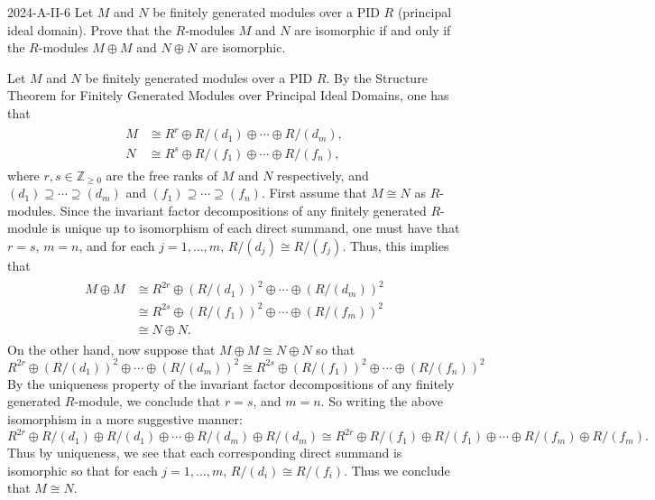 \documentclass{article}
\begin{document}
	\begin{prb}{2024-A-II-6}
		Let $M$ and $N$ be finitely generated modules over a PID $R$ (principal ideal domain). Prove that the $R$-modules $M$ and $N$ are isomorphic if and only if the $R$-modules $M \oplus M$ and $N \oplus N$ are isomorphic. 
	\end{prb}
	Let $M$ and $N$ be finitely generated modules over a PID $R$. By the Structure Theorem for Finitely Generated Modules over Principal Ideal Domains, one has that 
	\begin{align*}
		\begin{split}
			M &\cong R^{r} \oplus R/(d_1) \oplus \dotsm \oplus R/(d_m), \\
			N &\cong R^{s} \oplus R/(f_1) \oplus \dotsm \oplus R/(f_n), 
		\end{split}
	\end{align*}
	where $r, s \in \mathbb{Z}_{\geq 0}$ are the free ranks of $M$ and $N$ respectively, and $(d_1) \supseteq \dotsm \supseteq (d_m)$ and $(f_1) \supseteq \dotsm \supseteq (f_n)$. First assume that $M \cong N$ as $R$-modules. Since the invariant factor decompositions of any finitely generated $R$-module is unique up to isomorphism of each direct summand, one must have that $r = s$, $m = n$, and for each $j = 1, \ldots, m$, $R/(d_j) \cong R/(f_j)$. Thus, this implies that 
	\begin{align*}
		\begin{split}
			M \oplus M &\cong R^{2r} \oplus (R/(d_1))^2 \oplus \dotsm \oplus (R/(d_m))^2 \\
			&\cong R^{2s} \oplus (R/(f_1))^2 \oplus \dotsm \oplus (R/(f_m))^2 \\
			&\cong N \oplus N. 
		\end{split}
	\end{align*}
	On the other hand, now suppose that $M \oplus M \cong N \oplus N$ so that 
	\begin{equation*}
		R^{2r} \oplus (R/(d_1))^2 \oplus \dotsm \oplus (R/(d_m))^2
		\cong R^{2s} \oplus (R/(f_1))^2 \oplus \dotsm \oplus (R/(f_n))^2
	\end{equation*}
	By the uniqueness property of the invariant factor decompositions of any finitely generated $R$-module, we conclude that $r = s$, and $m = n$. So writing the above isomorphism in a more suggestive manner: 
	\begin{equation*}
		R^{2r} \oplus R/(d_1) \oplus R/(d_1) \oplus \dotsm \oplus R/(d_m) \oplus R/(d_m) \cong R^{2r} \oplus R/(f_1) \oplus R/(f_1) \oplus \dotsm \oplus R/(f_m) \oplus R/(f_m). 
	\end{equation*}
	Thus by uniqueness, we see that each corresponding direct summand is isomorphic so that for each $j = 1, \ldots, m$, $R/(d_i) \cong R/(f_i)$. Thus we conclude that $M \cong N$. 
\end{document}
